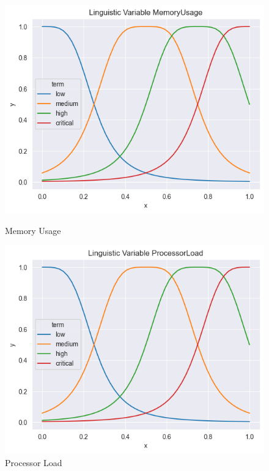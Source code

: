 \documentclass[11pt]{report}
\begin{document}
\begin{figure}[htbp]
    \centering
    \begin{minipage}{0.32\textwidth}
        \centering
        \includegraphics[width=\textwidth]{../images/first_bell/MemoryUsage}
        \caption{Memory Usage}
        \label{fig:first_bell_processor_load}
    \end{minipage}
    \hfill
    \begin{minipage}{0.32\textwidth}
        \centering
        \includegraphics[width=\textwidth]{../images/first_bell/ProcessorLoad}
        \caption{Processor Load}
        \label{fig:first_bell_memory_usage}

\end{minipage}
\end{figure}
\end{document}
